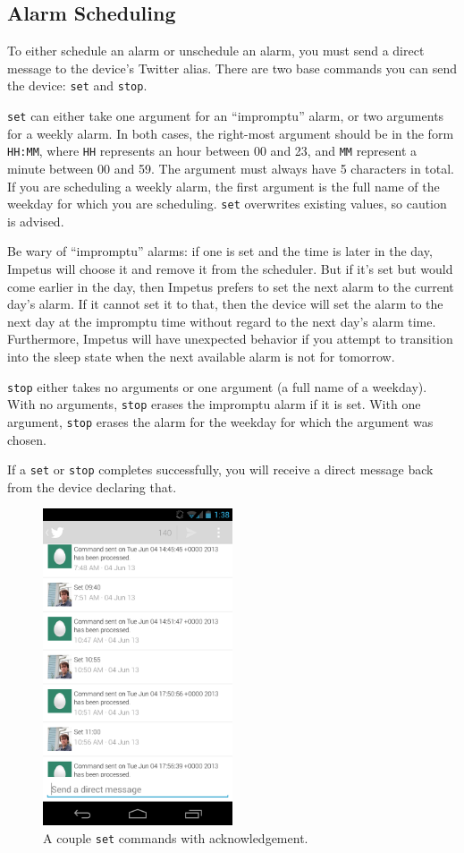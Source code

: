 \subsection{Alarm Scheduling}
To either schedule an alarm or unschedule an alarm, you must send a
direct message to the device's Twitter alias. There are two base
commands you can send the device: \verb|set| and \verb|stop|.

\verb|set| can either take one argument for an ``impromptu'' alarm, or
two arguments for a weekly alarm. In both cases, the right-most
argument should be in the form \verb|HH:MM|, where \verb|HH|
represents an hour between 00 and 23, and \verb|MM| represent a minute
between 00 and 59. The argument must always have 5 characters in
total. If you are scheduling a weekly alarm, the first argument is the
full name of the weekday for which you are scheduling. \verb|set|
overwrites existing values, so caution is advised.

Be wary of ``impromptu'' alarms: if one is set and the time is later
in the day, Impetus will choose it and remove it from the
scheduler. But if it's set but would come earlier in the day, then
Impetus prefers to set the next alarm to the current day's alarm. If
it cannot set it to that, then the device will set the alarm to the
next day at the impromptu time without regard to the next day's alarm
time. Furthermore, Impetus will have unexpected behavior if you
attempt to transition into the sleep state when the next available
alarm is not for tomorrow.

\verb|stop| either takes no arguments or one argument (a full name of
a weekday). With no arguments, \verb|stop| erases the impromptu alarm
if it is set. With one argument, \verb|stop| erases the alarm for the
weekday for which the argument was chosen.

If a \verb|set| or \verb|stop| completes successfully, you will
receive a direct message back from the device declaring that.

\begin{figure}[h!]
  \centering
  \includegraphics[width=0.5\textwidth]{twitop}
  \caption{A couple \texttt{set} commands with acknowledgement.}
\end{figure}


